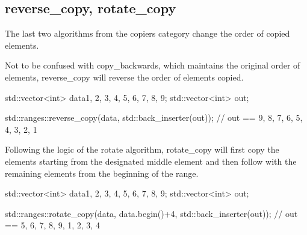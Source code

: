\subsection{reverse\_copy, rotate\_copy}

The last two algorithms from the copiers category change the order of copied elements.



Not to be confused with copy\_backwards, which maintains the original order of elements, reverse\_copy will reverse the order of elements copied.

\begin{box-note}
\begin{cppcode}
std::vector<int> data{1, 2, 3, 4, 5, 6, 7, 8, 9};
std::vector<int> out;

std::ranges::reverse_copy(data, std::back_inserter(out));
// out == { 9, 8, 7, 6, 5, 4, 3, 2, 1 }
\end{cppcode}
\end{box-note}



Following the logic of the rotate algorithm, rotate\_copy will first copy the elements starting from the designated middle element and then follow with the remaining elements from the beginning of the range.

\begin{box-note}
\begin{cppcode}
std::vector<int> data{1, 2, 3, 4, 5, 6, 7, 8, 9};
std::vector<int> out;

std::ranges::rotate_copy(data, data.begin()+4, std::back_inserter(out));
// out == { 5, 6, 7, 8, 9, 1, 2, 3, 4 }
\end{cppcode}
\end{box-note}
